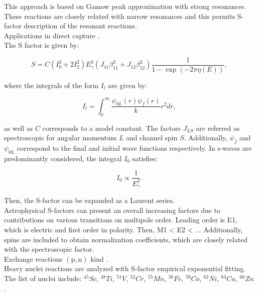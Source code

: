 \documentclass[openany]{book}
\begin{document}
This approach is based on Gamow peak approximation with strong resonances. These reactions are closely related with narrow resonances and this permits S-factor description of the resonant reactions.   \\

Applications in direct capture \cite{jennings_karataglidis_shoppa_1998}. \\

The S factor is given by:

\begin{equation}\label{eq:empirical_sFactor_integralFromula}
	S = C(I^2_0 + 2I^2_2) E^3_\gamma (J_{11}\beta^2_{11} + J_{12}\beta^2_{12}) \frac{1}{1 - \exp {(-2\pi \eta(E))}},
\end{equation}

where the integrals of the form $I_l$ are given by:

\begin{equation}\label{eq:empirical_sFactor_integralFromula_I.L}
	I_l = \int_{0}^{\infty} {\frac{\psi_{0L}(r) \psi_{f}(r)}{k} r^2 dr},
\end{equation}

as well as $C$ corresponds to a model constant. The factors $J_{LS}$ are referred as spectroscopic for angular momentum $L$ and channel spin $S$. Additionally, $\psi_f$ and $\psi_{0L}$ correspond to the final and initial wave functions respectively. In s-waves are predominantly considered,  the integral $I_0$ satisfies:

\begin{equation}\label{eq:empirical_sFactor_integralFromula_I.0}
	I_0 \propto \frac{1}{E^2_\gamma}.
\end{equation}

Then, the S-factor can be expanded as a Laurent series. \\

Astrophysical S-factors can present an overall increasing factors due to contributions on various transitions on multipole order.  Leading order is E1, which is electric and first order in polarity. Then, M1 < E2 < ...  Additionally, spins are included to obtain normalization coefficients, which are closely related with the spectroscopic factor. \\

 Exchange reactions $\mathrm{(p, n)}$ kind \cite{hussein_abdullah_2020}. \\
 
Heavy nuclei reactions are analyzed with S-factor empirical exponential fitting. The list of nuclei include: $\mathrm{{}^{45}}Sc$,  $\mathrm{{}^{48}}Ti$, $\mathrm{{}^{51}}V$, $\mathrm{{}^{52}}Cr$, $\mathrm{{}^{55}}Mn$,  $\mathrm{{}^{56}}Fe$, $\mathrm{{}^{59}}Co$, $\mathrm{{}^{62}}Ni$, $\mathrm{{}^{63}}Cu$, $\mathrm{{}^{66}}Zn$.
 
\end{document}
